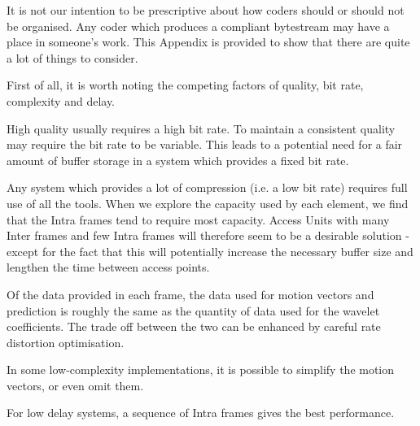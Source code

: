 It is not our intention to be prescriptive about how coders should or
should not be organised. Any coder which produces a compliant bytestream
may have a place in someone's work. This Appendix is provided to show
that there are quite a lot of things to consider.

First of all, it is worth noting the competing factors of quality, bit
rate, complexity and delay.

High quality usually requires a high bit rate. To maintain a consistent
quality may require the bit rate to be variable. This leads to a
potential need for a fair amount of buffer storage in a system which
provides a fixed bit rate.

Any system which provides a lot of compression (i.e. a low bit rate)
requires full use of all the tools. When we explore the capacity used by
each element, we find that the Intra frames tend to require most
capacity. Access Units with many Inter frames and few Intra frames will
therefore seem to be a desirable solution - except for the fact that
this will potentially increase the necessary buffer size and lengthen
the time between access points.

Of the data provided in each frame, the data used for motion vectors and
prediction is roughly the same as the quantity of data used for the
wavelet coefficients. The trade off between the two can be enhanced by
careful rate distortion optimisation.

In some low-complexity implementations, it is possible to simplify the
motion vectors, or even omit them.

For low delay systems, a sequence of Intra frames gives the best
performance.

